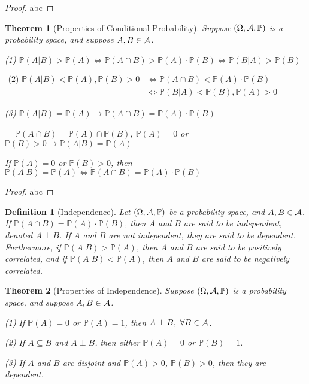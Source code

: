 \documentclass[openany,12pt]{book}
\newtheorem{theorem}{Theorem}[chapter]
\newtheorem{definition}{Definition}[chapter]
\begin{document}
\begin{proof}
  abc
\end{proof}

\begin{theorem}[Properties of Conditional Probability]
Suppose $(\Omega,\mathcal{A},\mathbb{P})$ is a probability space, and suppose $A,B\in\mathcal{A}$.

(1) $\mathbb{P}(A|B)>\mathbb{P}(A)\Leftrightarrow \mathbb{P}(A\cap B)>\mathbb{P}(A)\cdot \mathbb{P}(B)\Leftrightarrow \mathbb{P}(B|A)>\mathbb{P}(B)$

 $\begin{aligned}
\text{(2) }\mathbb{P}(A|B)<\mathbb{P}(A),\mathbb{P}(B)>0&\Leftrightarrow \mathbb{P}\left(A\cap B\right)<\mathbb{P}(A)\cdot \mathbb{P}(B)\\
                              &\Leftrightarrow \mathbb{P}(B|A)<\mathbb{P}(B),\mathbb{P}(A)>0
                                     \end{aligned}$
                                                          
(3) $\mathbb{P}(A|B)=\mathbb{P}(A)\to \mathbb{P}(A\cap B)=\mathbb{P}(A)\cdot \mathbb{P}(B)$

    $\quad\ \mathbb{P}(A\cap B)=\mathbb{P}(A)\cap \mathbb{P}(B),\ \mathbb{P}(A)=0$ or $\mathbb{P}(B)>0\to \mathbb{P}(A|B)=\mathbb{P}(A)$
    
If $\mathbb{P}(A)=0$ or $\mathbb{P}(B)>0$, then $\mathbb{P}(A|B)=\mathbb{P}(A)\Leftrightarrow \mathbb{P}(A\cap B)=\mathbb{P}(A)\cdot \mathbb{P}(B)  $

\end{theorem}

\begin{proof}
  abc
\end{proof}

\begin{definition}[Independence]
Let $(\Omega,\mathcal{A},\mathbb{P})$ be a probability space, and $A,B\in\mathcal{A}$. 
If $\mathbb{P}(A\cap B)=\mathbb{P}(A)\cdot \mathbb{P}(B)$, then $A$ and $B$ are said to be independent, denoted $A\perp B$. If $A$ and $B$ are not independent, they are said to be dependent. 
Furthermore, if $\mathbb{P}(A|B)>\mathbb{P}(A)$, then $A$ and $B$ are said to be positively correlated, and if $\mathbb{P}(A|B)<\mathbb{P}(A)$, then $A$ and $B$ are said to be negatively correlated.
\end{definition}

\begin{theorem}[Properties of Independence]
Suppose $(\Omega,\mathcal{A},\mathbb{P})$ is a probability space, and suppose  $A,B\in\mathcal{A}$.

(1) If $\mathbb{P}(A)=0$ or $\mathbb{P}(A)=1$, then $A\perp B,\ \forall B\in\mathcal{A}$.

(2) If $A\subseteq B$ and $A\perp B$, then either $\mathbb{P}(A)=0$ or $\mathbb{P}(B)=1$.

(3) If $A$ and $B$ are disjoint and $\mathbb{P}(A)>0$, $\mathbb{P}(B)>0$, then they are dependent.

\end{theorem}
\end{document}
